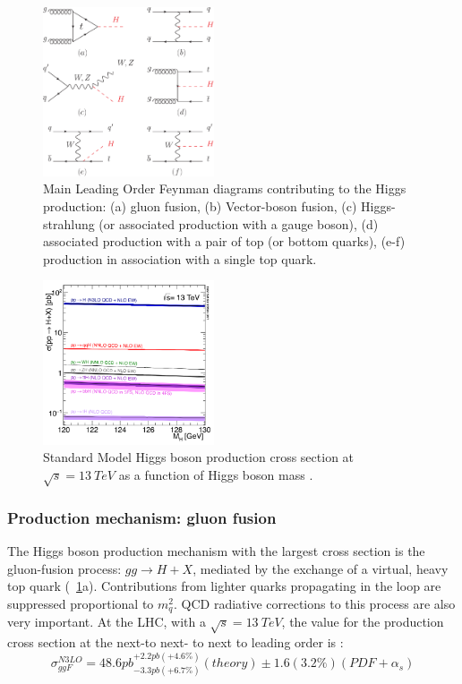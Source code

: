 \begin{figure}[htbp]
\centering
\includegraphics[width=0.45\textwidth]{Images/Feynman_H_production}
\caption{Main Leading Order Feynman diagrams contributing to the Higgs production: (a) gluon fusion, (b) Vector-boson fusion, (c) Higgs-strahlung (or associated production with a gauge boson), (d) associated production with a pair of top (or bottom quarks), (e-f) production in association with a single top quark.}
\label{Feynman_H_production}
\end{figure}
\begin{figure}[htbp]
\centering
\includegraphics[width=0.45\textwidth]{Images/plot_13tev_H_production}
\caption{Standard Model Higgs boson production cross section at $\sqrt{s} = 13\ TeV$ as a function of Higgs boson mass \cite{HiggsProduction}.}
\label{plot_13tev_H_production}
\end{figure}
\subsubsection{Production mechanism: gluon fusion}
The Higgs boson production mechanism with the largest cross section is the gluon-fusion process: $gg \to H + X$, mediated by the exchange of a virtual, heavy top quark (\figurename~\ref{Feynman_H_production}a). Contributions from lighter quarks propagating in the loop are suppressed proportional to $m_{q}^{2}$. QCD radiative corrections to this process are also very important. At the LHC, with a $\sqrt{s} = 13\ TeV$, the value for the production cross section at the next-to next- to next  to leading order is \cite{ggF_value}:
\begin{equation}
\sigma^{N3LO}_{ggF} = 48.6pb^{+2.2pb(+4.6\%)}_{-3.3pb(+6.7\%)}(theory) \pm 1.6(3.2\%)(PDF+\alpha_{s})
\label{ggH_cross_section}
\end{equation}
